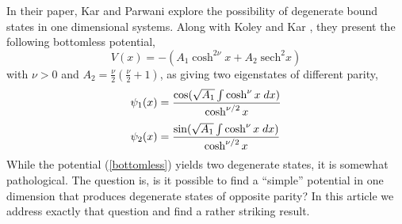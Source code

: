 \documentclass[12pt]{article}
\begin{document}
\par In their paper, Kar and Parwani \cite{Kar-Parwani} explore the possibility of degenerate bound states in one dimensional systems. Along with Koley and Kar \cite{Koley-Kar}, they present the following bottomless potential, 
\begin{equation}
V(x) = -(A_1\cosh^{2\nu}x + A_2\;\mathrm{sech}^2x)		\label{bottomless}
\end{equation}
with $\nu>0$ and $A_2 =\displaystyle \frac{\nu}{2}(\frac{\nu}{2}+1)$, as giving two eigenstates of different parity,
\begin{equation}
\begin{array}{l}
\psi_1(x)=\displaystyle\frac{\cos(\sqrt{A_1} \int \cosh^{\nu}x\;dx)}{\cosh^{\nu/2}x} \vspace{0.25cm}\\ 
\psi_2(x)=\displaystyle\frac{\sin(\sqrt{A_1} \int \cosh^{\nu}x\;dx)}{\cosh^{\nu/2}x} 
\end{array}
\end{equation}
While the potential (\ref{bottomless}) yields two degenerate states, it is somewhat pathological. The question is, is it possible to find a ``simple'' potential in one dimension that produces degenerate states of opposite parity? In this article we address exactly that question and find a rather striking result.

\end{document}
